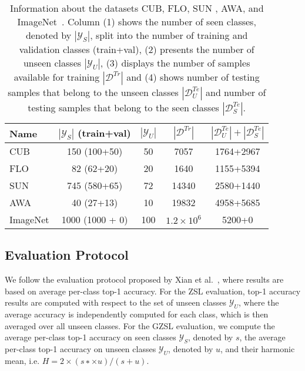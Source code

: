 \documentclass[runningheads]{llncs}
\begin{document}
\begin{table}[t]
\centering
\label{table:dataset-stats}
\caption{Information about the datasets CUB\cite{welinder2010caltech}, FLO\cite{nilsback2008automated}, SUN \cite{xiao2010sun}, AWA\cite{XianCVPR2017}, and ImageNet~\cite{deng2009imagenet}. Column (1) shows the number of seen classes, denoted by $|\mathcal{Y}_S|$, split into the number of training and validation classes (train+val), (2) presents the number of unseen classes $| \mathcal{Y}_U |$, (3) displays the number of samples available for training $|\mathcal{D}^{Tr}|$ and (4) shows number of testing samples that belong to the unseen classes $|\mathcal{D}_U^{Te}|$ and number of testing samples that belong to the seen classes $|\mathcal{D}_S^{Te}|$.}
\begin{tabular}{l|c|c|c|c}
\hline
\textbf{Name} & $|\mathcal{Y}_S|$ (train+val) & $|\mathcal{Y}_U|$ & $|\mathcal{D}^{Tr}|$ & $|\mathcal{D}^{Te}_U|+|\mathcal{D}^{Te}_S|$ \\
\hline
CUB     & 150 (100+50) & 50 & 7057 & 1764+2967  \\
FLO     & 82 (62+20) & 20 & 1640 & 1155+5394  \\
SUN    & 745 (580+65) & 72 & 14340 & 2580+1440   \\
AWA    & 40 (27+13) & 10 & 19832 & 4958+5685   \\
ImageNet & 1000 (1000 + 0) & 100 & $1.2 \times 10^6$ & 5200+0    \\
\hline
\end{tabular}
\end{table}
%


%
%
%
%
\subsection{Evaluation Protocol}

We follow the evaluation protocol proposed by Xian et al.~\cite{XianCVPR2017}, where results are based on average per-class top-1 accuracy.  For the ZSL evaluation, top-1 accuracy results are computed with respect to the set of unseen classes $\mathcal{Y}_U$, where the average accuracy is  independently computed for each class, which is then averaged over all unseen classes.  For the GZSL evaluation, we compute the average per-class top-1 accuracy on seen classes $\mathcal{Y}_S$, denoted by $s$, the average per-class top-1 accuracy on unseen classes $\mathcal{Y}_U$, denoted by $u$, and their harmonic mean, i.e. $H = 2 \times (s ∗\times u)/(s + u)$.
\end{document}
